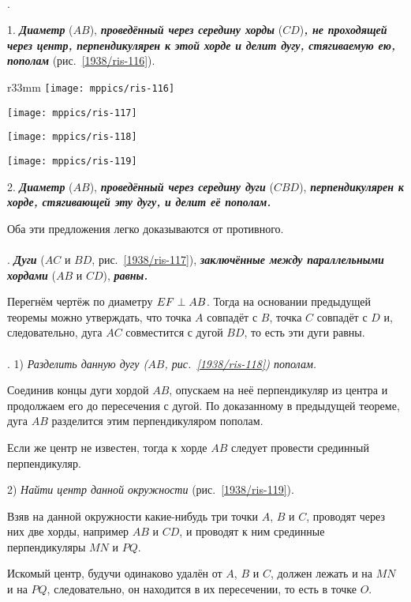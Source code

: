 {

\paragraph{}\label{1938/106}
\mbox{.}

1.
\textbf{\emph{Диаметр}} ($AB$), \textbf{\emph{проведённый через середину хорды}} ($CD$)\textbf{\emph{, не проходящей через центр, перпендикулярен к этой хорде и делит дугу, стягиваемую ею, пополам}} (рис.~\ref{1938/ris-116}).

\begin{wrapfigure}[36]{r}{33mm}
\centering
\texttt{[image: mppics/ris-116]}
\caption{}\label{1938/ris-116}
\bigskip
\texttt{[image: mppics/ris-117]}
\caption{}\label{1938/ris-117}
\bigskip
\texttt{[image: mppics/ris-118]}
\caption{}\label{1938/ris-118}
\bigskip
\texttt{[image: mppics/ris-119]}
\caption{}\label{1938/ris-119}
\end{wrapfigure}


2.
\textbf{\emph{Диаметр}} ($AB$), \textbf{\emph{проведённый через середину дуги}} ($CBD$), \textbf{\emph{перпендикулярен к хорде, стягивающей эту дугу, и делит её пополам.}}

Оба эти предложения легко доказываются от противного.


\paragraph{}\label{1938/107}
\mbox{.}
\textbf{\emph{Дуги}} ($AC$ и $BD$, рис.~\ref{1938/ris-117}), \textbf{\emph{заключённые между параллельными хордами}} ($AB$ и $CD$), \textbf{\emph{равны.}}

Перегнём чертёж по диаметру $EF\z\perp AB$.
Тогда на основании предыдущей теоремы можно утверждать, что точка $A$ совпадёт с $B$, точка $C$ совпадёт с $D$ и, следовательно, дуга $AC$ совместится с дугой $BD$, то есть эти дуги равны.

\paragraph{}\label{1938/108}
\mbox{.}
1) \emph{Разделить данную дугу \emph{($AB$, рис.~\ref{1938/ris-118})} пополам.}

Соединив концы дуги хордой $AB$, опускаем на неё перпендикуляр из центра и продолжаем его до пересечения с дугой.
По доказанному в предыдущей теореме, дуга $AB$ разделится этим перпендикуляром пополам.

Если же центр не известен, тогда к хорде $AB$ следует провести срединный перпендикуляр. 

2) \emph{Найти центр данной окружности} (рис.~\ref{1938/ris-119}).

Взяв на данной окружности какие-нибудь три точки $A$, $B$ и $C$, проводят через них две хорды, например $AB$ и $CD$, и проводят к ним срединные перпендикуляры $MN$ и $PQ$. 

Искомый центр, будучи одинаково удалён от $A$, $B$ и $C$, должен лежать и на $MN$ и на $PQ$, следовательно, он находится в их пересечении, то есть в точке $O$.

}
